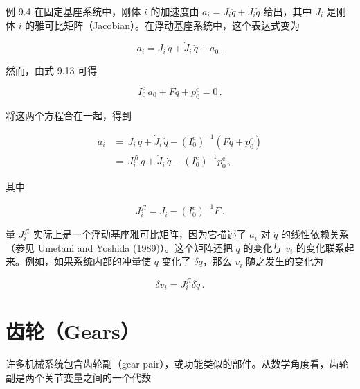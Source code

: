 \documentclass[10pt,a4paper]{book}
\theoremstyle{thmstyle} %
\theoremstyle{defstyle} %
\theoremstyle{prostyle} %
\begin{document}
例 9.4 在固定基座系统中，刚体 $i$ 的加速度由 $a_i = J_i\ddot{q} + \dot{J}_i\dot{q}$ 给出，其中 $J_i$ 是刚体 $i$ 的雅可比矩阵（Jacobian）。在浮动基座系统中，这个表达式变为



$$
a _ { i } = J _ { i } \, \ddot { q } + \dot { J } _ { i } \, \dot { q } + a _ { 0 } \, .
$$



然而，由式 9.13 可得



$$
I _ { 0 } ^{\mathrm { c} } \, a _ { 0 } + F \ddot { q } + p _ { 0 } ^{\mathrm { c} } = 0 \, .
$$



将这两个方程合在一起，得到



$$
\begin{array}{rl} { a _ { i } } & { = \, J _ { i } \, \ddot { q } + \dot { J } _ { i } \, \dot { q } - ( I _ { 0 } ^{\mathrm { c} } ) ^{- 1} ( F \ddot { q } + p _ { 0 } ^{\mathrm { c} } ) } \\& { = \, J _ { i } ^{f l} \, \ddot { q } + \dot { J } _ { i } \, \dot { q } - ( I _ { 0 } ^{\mathrm { c} } ) ^{- 1} p _ { 0 } ^{\mathrm { c} } \, , } \end{array}
$$



其中



$$
J _ { i } ^{f l} = J _ { i } - ( I _ { 0 } ^{c} ) ^{- 1} F \, .
$$



量 $J_{i}^{fl}$ 实际上是一个浮动基座雅可比矩阵，因为它描述了 $a_{i}$ 对 $\ddot{q}$ 的线性依赖关系（参见 Umetani and Yoshida (1989)）。这个矩阵还把 $\dot{q}$ 的变化与 $v_{i}$ 的变化联系起来。例如，如果系统内部的冲量使 $\dot{q}$ 变化了 $\delta\dot{q}$，那么 $v_{i}$ 随之发生的变化为



$$
\delta v _ { i } = J _ { i } ^{f l} \delta \dot { q } \, .
$$



\section{齿轮（Gears）}





许多机械系统包含齿轮副（gear pair），或功能类似的部件。从数学角度看，齿轮副是两个关节变量之间的一个代数
\end{document}
